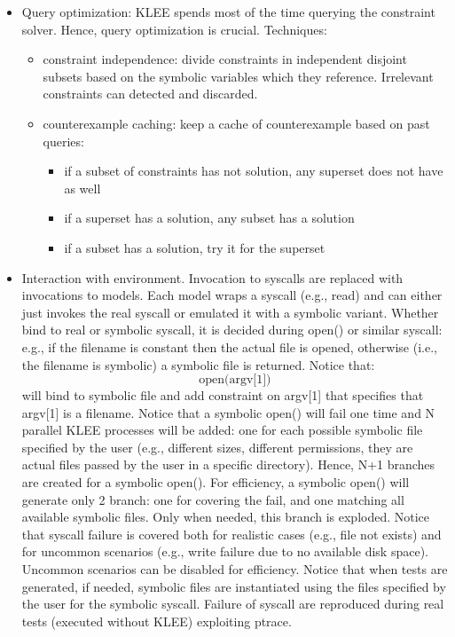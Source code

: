 \begin{itemize}
  \item Query optimization: KLEE spends most of the time querying the constraint solver. Hence, query optimization is crucial. Techniques:
    \begin{itemize}
      \item constraint independence: divide constraints in independent disjoint subsets based on the symbolic variables which they reference. Irrelevant constraints can detected and discarded.
      \item counterexample caching: keep a cache of counterexample based on past queries:
        \begin{itemize}
          \item if a subset of constraints has not solution, any superset does not have as well
          \item if a superset has a solution, any subset has a solution
          \item if a subset has a solution, try it for the superset
        \end{itemize}
    \end{itemize}
  \item Interaction with environment. Invocation to syscalls are replaced with invocations to models. Each model wraps a syscall (e.g., read) and can either just invokes the real syscall or emulated it with a symbolic variant. Whether bind to real or symbolic syscall, it is decided during open() or similar syscall: e.g., if the filename is constant then the actual file is opened, otherwise (i.e., the filename is symbolic) a symbolic file is returned. Notice that:
            \[ \text{open(argv[1])} \]
  will bind to symbolic file and add constraint on argv[1] that specifies that argv[1] is a filename. Notice that a symbolic open() will fail one time and N parallel KLEE processes will be added: one for each possible symbolic file specified by the user (e.g., different sizes, different permissions, they are actual files passed by the user in a specific directory). Hence, N+1 branches are created for a symbolic open(). For efficiency, a symbolic open() will generate only 2 branch: one for covering the fail, and one matching all available symbolic files. Only when needed, this branch is exploded. Notice that syscall failure is covered both for realistic cases (e.g., file not exists) and for uncommon scenarios (e.g., write failure due to no available disk space). Uncommon scenarios can be disabled for efficiency. Notice that when tests are generated, if needed, symbolic files are instantiated using the files specified by the user for the symbolic syscall. Failure of syscall are reproduced during real tests (executed without KLEE) exploiting ptrace.

\end{itemize}

